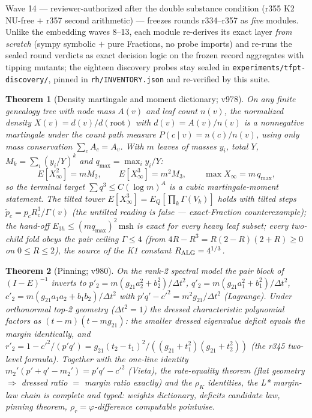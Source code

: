 \documentclass[11pt]{article}
\newtheorem{theorem}{Theorem}[section]
\theoremstyle{definition}
\theoremstyle{remark}
\begin{document}
Wave 14 --- reviewer-authorized after the double substance condition
(r355 K2 NU-free $+$ r357 second arithmetic) --- freezes rounds
r334--r357 as \emph{five} modules.  Unlike the embedding waves 8--13,
each module re-derives its exact layer \emph{from scratch} (sympy
symbolic $+$ pure Fractions, no probe imports) and re-runs the sealed
round verdicts as exact decision logic on the frozen record aggregates
with tipping mutants; the eighteen discovery probes stay sealed in
\texttt{experiments/tfpt-discovery/}, pinned in
\texttt{rh/INVENTORY.json} and re-verified by this suite.

\begin{theorem}[Density martingale and moment dictionary; v978]
\label{thm:density-martingale}
On any finite genealogy tree with node mass $A(v)$ and leaf count
$n(v)$, the normalized density $X(v) = d(v)/d(\mathrm{root})$ with
$d(v) = A(v)/n(v)$ is a nonnegative martingale under the count path
measure $P(c \mid v) = n(c)/n(v)$, using \emph{only} mass conservation
$\sum_c A_c = A_v$.  With $m$ leaves of masses $y_i$, total $Y$, $M_k
= \sum_i (y_i/Y)^k$ and $q_{\max} = \max_i y_i/Y$:
\[
E[X_\infty^2] = m M_2, \qquad E[X_\infty^3] = m^2 M_3, \qquad
\max X_\infty = m\,q_{\max},
\]
so the terminal target $\sum q^3 \le C (\log m)^A$ \emph{is} a cubic
martingale-moment statement.  The tilted tower $E[X_\infty^3] =
E_Q[\prod_k \Gamma(V_k)]$ holds with tilted steps $\tilde p_c = p_c
R_c^3/\Gamma(v)$ (the untilted reading is false --- exact-Fraction
counterexample); the hand-off $E_{3h} \le (m q_{\max})^2\,\mathrm{msh}$
is exact for every heavy leaf subset; every two-child fold obeys the
pair ceiling $\Gamma \le 4$ (from $4R - R^3 = R(2-R)(2+R) \ge 0$ on
$0 \le R \le 2$), the source of the K1 constant $R_{\rm ALG} =
4^{1/3}$.
\end{theorem}

\begin{theorem}[Pinning; v980]\label{thm:pinning}
On the rank-2 spectral model the pair block of $(I-E)^{-1}$ inverts to
$p'_2 = m(g_{21}a_2^2 + b_2^2)/\Delta t^2$, $q'_2 = m(g_{21}a_1^2 +
b_1^2)/\Delta t^2$, $c'_2 = m(g_{21}a_1a_2 + b_1b_2)/\Delta t^2$ with
$p'q' - c'^2 = m^2 g_{21}/\Delta t^2$ (Lagrange).  Under orthonormal
top-2 geometry ($\Delta t^2 = 1$) the dressed characteristic
polynomial factors as $(t - m)(t - m g_{21})$: the smaller dressed
eigenvalue deficit \emph{equals the margin identically}, and $r'_2 =
1 - c'^2/(p'q') = g_{21}(t_2-t_1)^2/((g_{21}+t_1^2)(g_{21}+t_2^2))$
(the r345 two-level formula).  Together with the one-line identity
$m_2'(p'+q'-m_2') = p'q'-c'^2$ (Vieta), the rate-equality theorem
(flat geometry $\Rightarrow$ dressed ratio $=$ margin ratio exactly)
and the $\rho_K$ identities, the L* margin-law chain is complete and
typed: weights dictionary, deficits candidate law, pinning theorem,
$\rho_r = \varphi$-difference computable pointwise.
\end{theorem}
\end{document}
